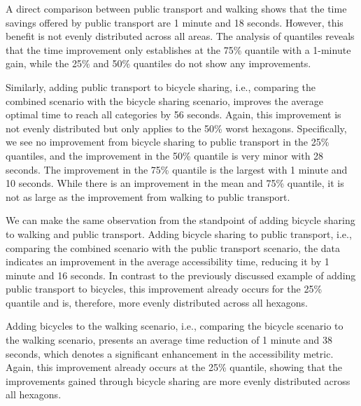 A direct comparison between public transport and walking shows that the time savings offered by public transport are 1 minute and 18 seconds. 
However, this benefit is not evenly distributed across all areas.
The analysis of quantiles reveals that the time improvement only establishes at the 75\% quantile with a 1-minute gain, while the 25\% and 50\% quantiles do not show any improvements.

Similarly, adding public transport to bicycle sharing, i.e., comparing the combined scenario with the bicycle sharing scenario, improves the average optimal time to reach all categories by 56 seconds.
Again, this improvement is not evenly distributed but only applies to the 50\% worst hexagons.
Specifically, we see no improvement from bicycle sharing to public transport in the 25\% quantiles, and the improvement in the 50\% quantile is very minor with 28 seconds.
The improvement in the 75\% quantile is the largest with 1 minute and 10 seconds.
While there is an improvement in the mean and 75\% quantile, it is not as large as the improvement from walking to public transport.

We can make the same observation from the standpoint of adding bicycle sharing to walking and public transport.
Adding bicycle sharing to public transport, i.e., comparing the combined scenario with the public transport scenario, the data indicates an improvement in the average accessibility time, reducing it by 1 minute and 16 seconds.
In contrast to the previously discussed example of adding public transport to bicycles, this improvement already occurs for the 25\% quantile and is, therefore, more evenly distributed across all hexagons.

Adding bicycles to the walking scenario, i.e., comparing the bicycle scenario to the walking scenario, presents an average time reduction of 1 minute and 38 seconds, which denotes a significant enhancement in the accessibility metric. 
Again, this improvement already occurs at the 25\% quantile, showing that the improvements gained through bicycle sharing are more evenly distributed across all hexagons.

